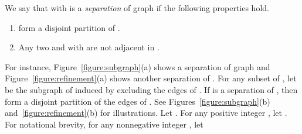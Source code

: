 \documentclass[12pt]{article}
\newcounter{pcounter}
\begin{document}
We say that  with  is a {\em separation} of
graph  if the following properties hold.
\begin{enumerate}[\em Property~S1:]
\addtolength{\itemsep}{-0.5\baselineskip}
\item 
\label{separation:1}
 form a disjoint partition of .
\item 
\label{separation:2}
Any two  and  with  are not adjacent
in . 
\setcounter{pcounter}{\theenumi}
\end{enumerate}
For instance, Figure~\ref{figure:subgraph}(a) shows a separation
 of graph  and Figure~\ref{figure:refinement}(a)
shows another separation  of .
For any subset  of , let  be the subgraph of 
induced by  excluding the edges of .  If
 is a separation of , then
 form a disjoint partition of the edges
of .  See Figures~\ref{figure:subgraph}(b)
and~\ref{figure:refinement}(b) for illustrations.
Let .  For any positive integer , let .  For notational brevity, for any
nonnegative integer , let
\end{document}

